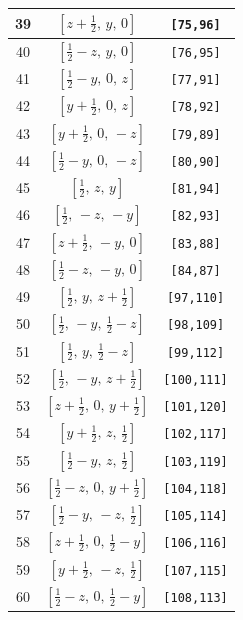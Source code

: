 \documentclass[fleqn,8pt]{jsarticle}
\begin{document}
\begin{longtable}{ccc}
39 & $\left[ z + \frac{1}{2},\, y,\, 0 \right]$ & {\tt [75,96]} \\ \hline
40 & $\left[ \frac{1}{2} - z,\, y,\, 0 \right]$ & {\tt [76,95]} \\ \hline
41 & $\left[ \frac{1}{2} - y,\, 0,\, z \right]$ & {\tt [77,91]} \\ \hline
42 & $\left[ y + \frac{1}{2},\, 0,\, z \right]$ & {\tt [78,92]} \\ \hline
43 & $\left[ y + \frac{1}{2},\, 0,\, - z \right]$ & {\tt [79,89]} \\ \hline
44 & $\left[ \frac{1}{2} - y,\, 0,\, - z \right]$ & {\tt [80,90]} \\ \hline
45 & $\left[ \frac{1}{2},\, z,\, y \right]$ & {\tt [81,94]} \\ \hline
46 & $\left[ \frac{1}{2},\, - z,\, - y \right]$ & {\tt [82,93]} \\ \hline
47 & $\left[ z + \frac{1}{2},\, - y,\, 0 \right]$ & {\tt [83,88]} \\ \hline
48 & $\left[ \frac{1}{2} - z,\, - y,\, 0 \right]$ & {\tt [84,87]} \\ \hline
49 & $\left[ \frac{1}{2},\, y,\, z + \frac{1}{2} \right]$ & {\tt [97,110]} \\ \hline
50 & $\left[ \frac{1}{2},\, - y,\, \frac{1}{2} - z \right]$ & {\tt [98,109]} \\ \hline
51 & $\left[ \frac{1}{2},\, y,\, \frac{1}{2} - z \right]$ & {\tt [99,112]} \\ \hline
52 & $\left[ \frac{1}{2},\, - y,\, z + \frac{1}{2} \right]$ & {\tt [100,111]} \\ \hline
53 & $\left[ z + \frac{1}{2},\, 0,\, y + \frac{1}{2} \right]$ & {\tt [101,120]} \\ \hline
54 & $\left[ y + \frac{1}{2},\, z,\, \frac{1}{2} \right]$ & {\tt [102,117]} \\ \hline
55 & $\left[ \frac{1}{2} - y,\, z,\, \frac{1}{2} \right]$ & {\tt [103,119]} \\ \hline
56 & $\left[ \frac{1}{2} - z,\, 0,\, y + \frac{1}{2} \right]$ & {\tt [104,118]} \\ \hline
57 & $\left[ \frac{1}{2} - y,\, - z,\, \frac{1}{2} \right]$ & {\tt [105,114]} \\ \hline
58 & $\left[ z + \frac{1}{2},\, 0,\, \frac{1}{2} - y \right]$ & {\tt [106,116]} \\ \hline
59 & $\left[ y + \frac{1}{2},\, - z,\, \frac{1}{2} \right]$ & {\tt [107,115]} \\ \hline
60 & $\left[ \frac{1}{2} - z,\, 0,\, \frac{1}{2} - y \right]$ & {\tt [108,113]} \\ \hline

\end{longtable}
\end{document}
